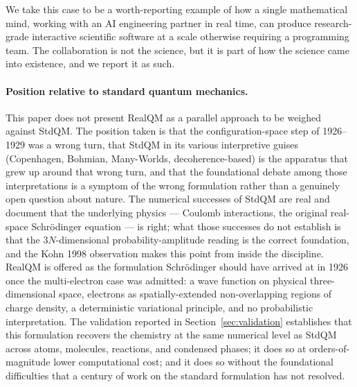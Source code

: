 \documentclass[11pt]{article}
\begin{document}
We take this case to be a worth-reporting example of how a single mathematical mind, working with an AI engineering partner in real time, can produce research-grade interactive scientific software at a scale otherwise requiring a programming team. The collaboration is not the science, but it is part of how the science came into existence, and we report it as such.

\paragraph{Position relative to standard quantum mechanics.}
This paper does not present RealQM as a parallel approach to be weighed against StdQM. The position taken is that the configuration-space step of 1926--1929 was a wrong turn, that StdQM in its various interpretive guises (Copenhagen, Bohmian, Many-Worlds, decoherence-based) is the apparatus that grew up around that wrong turn, and that the foundational debate among those interpretations is a symptom of the wrong formulation rather than a genuinely open question about nature. The numerical successes of StdQM are real and document that the underlying physics --- Coulomb interactions, the original real-space Schr\"odinger equation --- is right; what those successes do not establish is that the $3N$-dimensional probability-amplitude reading is the correct foundation, and the Kohn 1998 observation makes this point from inside the discipline. RealQM is offered as the formulation Schr\"odinger should have arrived at in 1926 once the multi-electron case was admitted: a wave function on physical three-dimensional space, electrons as spatially-extended non-overlapping regions of charge density, a deterministic variational principle, and no probabilistic interpretation. The validation reported in Section~\ref{sec:validation} establishes that this formulation recovers the chemistry at the same numerical level as StdQM across atoms, molecules, reactions, and condensed phases; it does so at orders-of-magnitude lower computational cost; and it does so without the foundational difficulties that a century of work on the standard formulation has not resolved.
\end{document}
